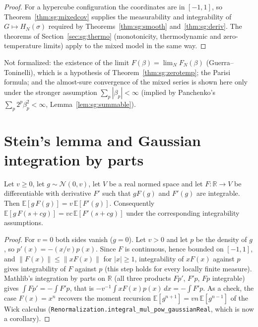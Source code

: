 \begin{proof}
  \leanok
For a hypercube configuration the coordinates are in $[-1,1]$, so Theorem~\ref{thm:sg:mixedcov} supplies the
measurability and integrability of $G\mapsto H_N(\sigma)$ required by Theorems~\ref{thm:sg:smooth} and~\ref{thm:sg:deriv}.
The theorems of Section~\ref{sec:sg:thermo} (monotonicity, thermodynamic and zero-temperature limits) apply to the mixed
model in the same way.
\end{proof}

\begin{remark}
Not formalized: the existence of the limit $F(\beta)=\lim_NF_N(\beta)$ (Guerra--Toninelli), which is a hypothesis of
Theorem~\ref{thm:sg:zerotemp}; the Parisi formula; and the almost-sure convergence of the mixed series is shown here
only under the stronger assumption $\sum_p|\beta_p|<\infty$ (implied by Panchenko's $\sum_p2^p\beta_p^2<\infty$,
Lemma~\ref{lem:sg:summable}).
\end{remark}

\section{Stein's lemma and Gaussian integration by parts}\label{sec:sg:stein}

\begin{theorem}\label{thm:sg:stein1d}
  \leanok
Let $v\ge0$, let $g\sim\mathcal N(0,v)$, let $V$ be a real normed space and let $F:\mathbb R\to V$ be differentiable
with derivative $F'$ such that $gF(g)$ and $F'(g)$ are integrable. Then $\mathbb E[g\,F(g)]=v\,\mathbb E[F'(g)]$.
Consequently $\mathbb E[g\,F(s+cg)]=vc\,\mathbb E[F'(s+cg)]$ under the corresponding integrability assumptions.
\end{theorem}

\begin{proof}
  \leanok
For $v=0$ both sides vanish ($g=0$). Let $v>0$ and let $p$ be the density of $g$, so $p'(x)=-(x/v)p(x)$. Since $F$ is
continuous, hence bounded on $[-1,1]$, and $\|F(x)\|\le\|xF(x)\|$ for $|x|\ge1$, integrability of $xF(x)$ against $p$ gives integrability of $F$ against
$p$ (this step holds for every locally finite measure). Mathlib's integration by parts on $\mathbb R$ (all three products $Fp'$, $F'p$, $Fp$ integrable) gives
$\int Fp'=-\int F'p$, that is $-v^{-1}\int xF(x)p(x)\,dx=-\int F'p$. As a check, the case $F(x)=x^n$ recovers the moment recursion
$\mathbb E[g^{n+1}]=vn\,\mathbb E[g^{n-1}]$ of the Wick calculus (\texttt{Renormalization.integral\_mul\_pow\_gaussianReal}, which is now
a corollary).
\end{proof}

